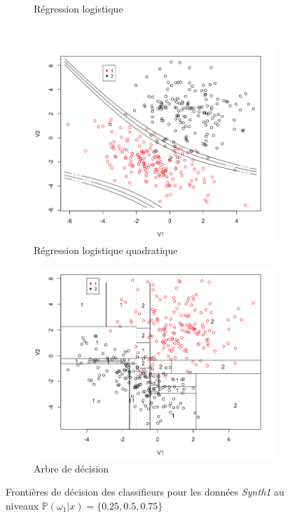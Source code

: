 \documentclass[a4paper,10pt]{report}
\begin{document}
\begin{figure}[H]
\begin{subfigure}[b]{0.45\linewidth}
		\caption{\small Régression logistique}
		\label{fig:front-decision-synth-1-reg-log}%
	\end{subfigure}\\%
	\begin{subfigure}[b]{0.45\linewidth}
		\centering
		\captionsetup{justification=centering, margin=1cm}
		\includegraphics[width=1\linewidth]{img/front-decision-synth-1-reg-log-quad}
		\caption{\small Régression logistique quadratique}
		\label{fig:front-decision-synth-1-reg-log-quad}%
	\end{subfigure}%
	\begin{subfigure}[b]{0.45\linewidth}
		\centering
		\captionsetup{justification=centering, margin=1cm}
		\includegraphics[width=1\linewidth]{img/front-decision-synth-1-tree}
		\caption{\small Arbre de décision}
		\label{fig:front-decision-synth-1-tree}%
	\end{subfigure}%
	\caption{\small Frontières de décision des classifieurs pour les données \textit{Synth1} au niveaux $\mathbb{P}(\omega_1|x) = \{0.25, 0.5, 0.75\}$}
	\label{fig:front-decision-synth-1}%
\end{figure}
\end{document}
